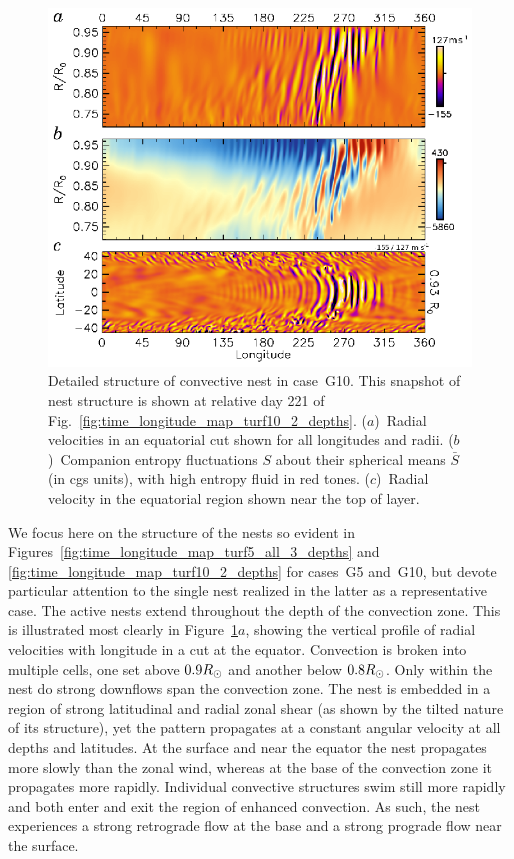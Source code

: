  
\begin{figure}
  \begin{center}
    \includegraphics[width=0.9\linewidth]{figs/chapter_4/Figure_17.eps}
  \end{center}
  \caption[Detailed structure of convective nest in case~G10]
   {Detailed structure of convective nest in case~G10.  This snapshot
   of nest structure is shown at relative day 221 of
    Fig.~\ref{fig:time_longitude_map_turf10_2_depths}.  ($a$)~Radial
    velocities in an equatorial cut shown for all longitudes and
    radii.  
    ($b$)~Companion entropy fluctuations $S$ about
    their spherical means $\bar{S}$ (in cgs units), with high entropy
    fluid in red tones.
    ($c$)~Radial velocity in the equatorial region shown near the top of layer.
    \label{fig:G10_patch}}
\end{figure}
 

We focus here on the structure of the nests so evident in
Figures~\ref{fig:time_longitude_map_turf5_all_3_depths} and
\ref{fig:time_longitude_map_turf10_2_depths} for cases~G5 and~G10, but
devote particular attention to the single nest realized in the latter
as a representative case.  The active nests extend throughout the
depth of the convection zone.  This is illustrated most clearly in
Figure~\ref{fig:G10_patch}$a$, showing the vertical profile
of radial velocities with longitude in a cut at the equator.
Convection is broken into multiple cells, one set above $0.9 R_\odot$
and another below $0.8 R_\odot$.  Only within the nest do strong downflows
span the convection zone.  The nest is embedded in a region of strong
latitudinal and radial zonal shear (as shown by the tilted nature of
its structure), yet the pattern propagates at a constant angular
velocity at all depths and latitudes.  At the surface and near the
equator the nest propagates more slowly than the zonal wind,
whereas at the base of the convection zone it propagates more rapidly.
Individual convective structures swim still more rapidly and both
enter and exit the region of enhanced convection.  As such, the nest
experiences a strong retrograde flow at the base and a strong prograde
flow near the surface.  

